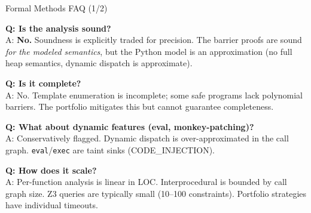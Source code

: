 \documentclass[aspectratio=169]{beamer}
\begin{document}
\begin{frame}{Formal Methods FAQ (1/2)}

\textbf{Q: Is the analysis sound?}\\
A: \textbf{No.} Soundness is explicitly traded for precision. The barrier proofs are sound \emph{for the modeled semantics}, but the Python model is an approximation (no full heap semantics, dynamic dispatch is approximate).

\vspace{0.5em}
\textbf{Q: Is it complete?}\\
A: No. Template enumeration is incomplete; some safe programs lack polynomial barriers. The portfolio mitigates this but cannot guarantee completeness.

\vspace{0.5em}
\textbf{Q: What about dynamic features (eval, monkey-patching)?}\\
A: Conservatively flagged. Dynamic dispatch is over-approximated in the call graph. \texttt{eval}/\texttt{exec} are taint sinks (CODE\_INJECTION).

\vspace{0.5em}
\textbf{Q: How does it scale?}\\
A: Per-function analysis is linear in LOC. Interprocedural is bounded by call graph size. Z3 queries are typically small (10--100 constraints). Portfolio strategies have individual timeouts.

\end{frame}
\end{document}
